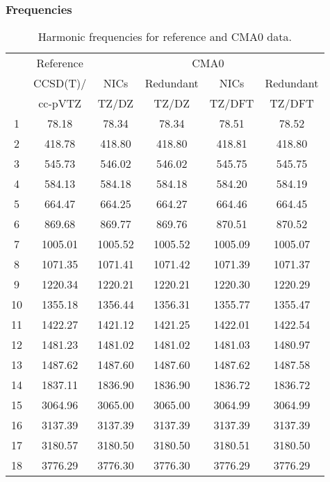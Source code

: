 \documentclass[10pt,oneside]{article}
\begin{document}
\begin{table}[h!]
\subsubsection*{Frequencies}
\centering
\caption{Harmonic frequencies for reference and CMA0 data.}
\begin{tabular}{cccccc}
\toprule
{} & Reference & \multicolumn{4}{c}{CMA0} \\
{} &  CCSD(T)/ &    NICs &  Redundant &    NICs & Redundant \\
{} &   cc-pVTZ &   TZ/DZ &      TZ/DZ &  TZ/DFT &    TZ/DFT \\
\midrule
1  &     78.18 &   78.34 &      78.34 &   78.51 &     78.52 \\
2  &    418.78 &  418.80 &     418.80 &  418.81 &    418.80 \\
3  &    545.73 &  546.02 &     546.02 &  545.75 &    545.75 \\
4  &    584.13 &  584.18 &     584.18 &  584.20 &    584.19 \\
5  &    664.47 &  664.25 &     664.27 &  664.46 &    664.45 \\
6  &    869.68 &  869.77 &     869.76 &  870.51 &    870.52 \\
7  &   1005.01 & 1005.52 &    1005.52 & 1005.09 &   1005.07 \\
8  &   1071.35 & 1071.41 &    1071.42 & 1071.39 &   1071.37 \\
9  &   1220.34 & 1220.21 &    1220.21 & 1220.30 &   1220.29 \\
10 &   1355.18 & 1356.44 &    1356.31 & 1355.77 &   1355.47 \\
11 &   1422.27 & 1421.12 &    1421.25 & 1422.01 &   1422.54 \\
12 &   1481.23 & 1481.02 &    1481.02 & 1481.03 &   1480.97 \\
13 &   1487.62 & 1487.60 &    1487.60 & 1487.62 &   1487.58 \\
14 &   1837.11 & 1836.90 &    1836.90 & 1836.72 &   1836.72 \\
15 &   3064.96 & 3065.00 &    3065.00 & 3064.99 &   3064.99 \\
16 &   3137.39 & 3137.39 &    3137.39 & 3137.39 &   3137.39 \\
17 &   3180.57 & 3180.50 &    3180.50 & 3180.51 &   3180.50 \\
18 &   3776.29 & 3776.30 &    3776.30 & 3776.29 &   3776.29 \\
\bottomrule
\end{tabular}
\end{table}
\end{document}
